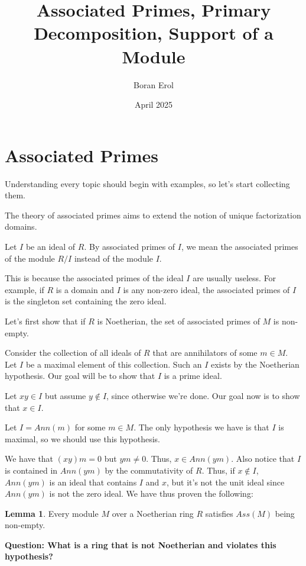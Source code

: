 \documentclass{article}
\title{Associated Primes, Primary Decomposition, Support of a Module}
\date{April 2025}
\author{Boran Erol}
\theoremstyle{definition}
\newtheorem{lemma}[theorem]{Lemma}
\begin{document}
\maketitle

\section{Associated Primes}

Understanding every topic should begin with examples, so let's start collecting them.

The theory of associated primes aims to extend the notion of unique factorization domains.

Let $ I $ be an ideal of $ R $. By associated primes of $ I $, we mean the associated
primes of the module $ R/I $ instead of the module $ I $.

This is because the associated primes of the ideal $ I $ are usually useless.
For example, if $ R $ is a domain and $ I $ is any non-zero ideal, the associated
primes of $ I $ is the singleton set containing the zero ideal.

Let's first show that if $ R $ is Noetherian, the set of associated primes
of $ M $ is non-empty.

Consider the collection of all ideals of $ R $ that are annihilators of
some $ m \in M $. Let $ I $ be a maximal element of this collection.
Such an $ I $ exists by the Noetherian hypothesis. Our goal will
be to show that $ I $ is a prime ideal.

Let $ xy \in I $ but assume $ y \notin I $, since otherwise we're done.
Our goal now is to show that $ x \in I $.

Let $ I = Ann(m) $ for some $ m \in M $. The only hypothesis we have
is that $ I $ is maximal, so we should use this hypothesis.

We have that $ (xy) m = 0 $ but $ ym \neq 0 $. Thus, $ x \in Ann(ym) $.
Also notice that $ I $ is contained in $ Ann(ym) $ by the commutativity of $ R $.
Thus, if $ x \notin I $, $ Ann(ym) $ is an ideal that contains $ I $ and $ x $,
but it's not the unit ideal since $ Ann(ym) $ is not the zero ideal. We have
thus proven the following:

\begin{lemma}
    Every module $ M $ over a Noetherian ring $ R $ satisfies
    $ Ass(M) $ being non-empty.
\end{lemma}

\textbf{Question: What is a ring that is not Noetherian and violates this hypothesis?}
\end{document}
